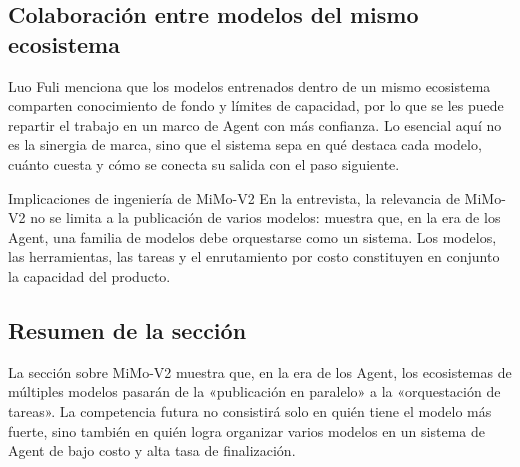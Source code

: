 \subsection{Colaboración entre modelos del mismo ecosistema}

Luo Fuli menciona que los modelos entrenados dentro de un mismo ecosistema comparten conocimiento de fondo y límites de capacidad, por lo que se les puede repartir el trabajo en un marco de Agent con más confianza. Lo esencial aquí no es la sinergia de marca, sino que el sistema sepa en qué destaca cada modelo, cuánto cuesta y cómo se conecta su salida con el paso siguiente.

\begin{importantbox}{Implicaciones de ingeniería de MiMo-V2}
En la entrevista, la relevancia de MiMo-V2 no se limita a la publicación de varios modelos: muestra que, en la era de los Agent, una familia de modelos debe orquestarse como un sistema. Los modelos, las herramientas, las tareas y el enrutamiento por costo constituyen en conjunto la capacidad del producto.
\end{importantbox}

\subsection{Resumen de la sección}

La sección sobre MiMo-V2 muestra que, en la era de los Agent, los ecosistemas de múltiples modelos pasarán de la «publicación en paralelo» a la «orquestación de tareas». La competencia futura no consistirá solo en quién tiene el modelo más fuerte, sino también en quién logra organizar varios modelos en un sistema de Agent de bajo costo y alta tasa de finalización.
